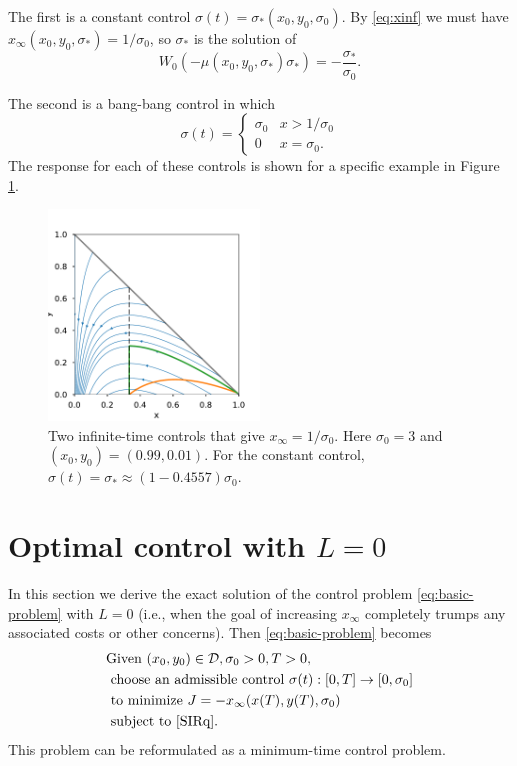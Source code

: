 \documentclass[english,12pt,letter]{article}
\newcommand{\Rnot}{\sigma_0}
\newcommand{\Sinf}{x_\infty}
\newcommand{\dom}{{\mathcal D}}
\begin{document}
The first is a constant control $\sigma(t) = \sigma_*(x_0, y_0, \Rnot)$.
By \eqref{eq:xinf} we must have $\Sinf(x_0,y_0,\sigma_*)=1/\Rnot$, so $\sigma_*$ is the solution of
$$
    W_0(-\mu(x_0,y_0,\sigma_*)\sigma_*) = -\frac{\sigma_*}{\sigma_0}.
$$

The second is a bang-bang control in which
$$
    \sigma(t) = \begin{cases} \Rnot & x>1/\Rnot \\ 0 & x=\Rnot. \end{cases}
$$
The response for each of these controls is shown for a specific example in
Figure \ref{fig:two-controls}.
\begin{figure}
    \centering
    \includegraphics[width=0.5\textwidth]{figures/twocontrols.pdf}
    \caption{Two infinite-time controls that give $\Sinf=1/\Rnot$.  Here $\Rnot=3$ and
        $(x_0,y_0)=(0.99,0.01)$.  For the constant control, $\sigma(t)=\sigma_*\approx(1-0.4557)\Rnot$.\label{fig:two-controls}}
\end{figure}



\section{Optimal control with $L=0$\label{sec:analytic}}
In this section we derive the exact solution of the control problem
\eqref{eq:basic-problem} with $L=0$ (i.e., when the goal of increasing $x_\infty$ completely
trumps any associated costs or other concerns).  Then \eqref{eq:basic-problem} becomes
\begin{align} \label{eq:no-cost-problem}
\begin{aligned}
& \text{Given } (x_0, y_0)\in \dom, \sigma_0>0, T>0, \\
& \text{ choose an admissible control } \sigma(t): [0,T] \to [0,\Rnot] \\
& \text{ to minimize }  J = -x_\infty(x(T),y(T),\sigma_0) \\
& \text{ subject to } \eqref{SIRq}.
\end{aligned}
\end{align}
This problem can be reformulated as a minimum-time control problem.  
\end{document}
